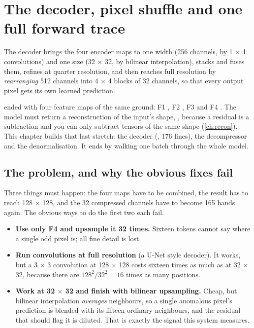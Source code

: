 \chapter{The decoder, pixel shuffle and one full forward trace}\label{ch:decoder}

\begin{onething}
The decoder brings the four encoder maps to one width (256 channels, by 1 $\times$ 1 convolutions) and
one size (32 $\times$ 32, by bilinear interpolation), stacks and fuses them, refines at quarter
resolution, and then reaches full resolution by \emph{rearranging} 512 channels into 4 $\times$ 4 blocks
of 32 channels, so that every output pixel gets its own learned prediction.
\end{onething}

 ended with four feature maps of the same ground: F1 , F2
, F3  and F4 . The model must return a
reconstruction of the input's shape, , because a residual is a subtraction and
you can only subtract tensors of the same shape (\cref{ch:recon}). This chapter builds that last stretch:
the decoder (, 176 lines), the
decompressor and the denormalisation. It ends by walking one batch through the whole model.

\section{The problem, and why the obvious fixes fail}\label{sec:decoder:why}

Three things must happen: the four maps have to be combined, the result has to reach 128 $\times$ 128,
and the 32 compressed channels have to become 165 bands again. The obvious ways to do the first two
each fail.

\begin{itemize}
\item \textbf{Use only F4 and upsample it 32 times.} Sixteen tokens cannot say where a single odd pixel
is; all fine detail is lost.
\item \textbf{Run convolutions at full resolution} (a U-Net style decoder). It works, but a 3 $\times$ 3
convolution at 128 $\times$ 128 costs sixteen times as much as at 32 $\times$ 32, because there are
$128^2 / 32^2 = 16$ times as many positions.
\item \textbf{Work at 32 $\times$ 32 and finish with bilinear upsampling.} Cheap, but bilinear
interpolation \emph{averages} neighbours, so a single anomalous pixel's prediction is blended with its
fifteen ordinary neighbours, and the residual that should flag it is diluted. That is exactly the
signal this system measures.
\end{itemize}

